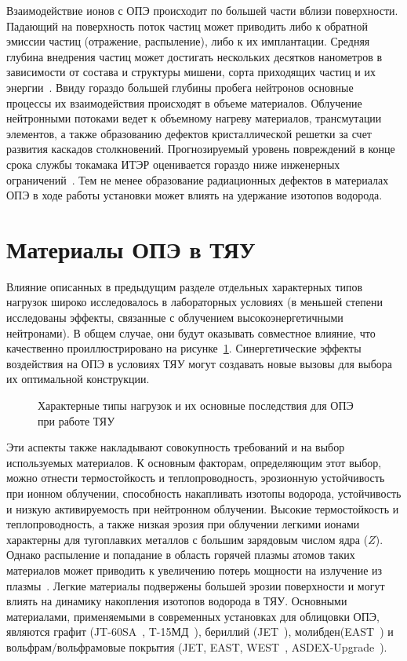 Взаимодействие ионов с ОПЭ происходит по большей части вблизи поверхности. Падающий на поверхность поток частиц может приводить либо к обратной эмиссии частиц (отражение, распыление), либо к их имплантации. Средняя глубина внедрения частиц может достигать нескольких десятков нанометров в зависимости от состава и структуры мишени, сорта приходящих частиц и их энергии~\cite{eckstein2010penetration}. Ввиду гораздо большей глубины пробега нейтронов основные процессы их взаимодействия происходят в объеме материалов. Облучение нейтронными потоками ведет к объемному нагреву материалов, трансмутации элементов, а также образованию дефектов кристаллической решетки за счет развития каскадов столкновений. Прогнозируемый уровень повреждений в конце срока службы токамака ИТЭР оценивается гораздо ниже инженерных ограничений~\cite{Villari2013}. Тем не менее образование радиационных дефектов в материалах ОПЭ в ходе работы установки может влиять на удержание изотопов водорода.

\section{Материалы ОПЭ в ТЯУ}\label{sec:ch1/sec2}

Влияние описанных в предыдущим разделе отдельных характерных типов нагрузок широко исследовалось в лабораторных условиях (в меньшей степени исследованы эффекты, связанные с облучением высокоэнергетичными нейтронами). В общем случае, они будут оказывать совместное влияние, что качественно проиллюстрировано на рисунке~\cref{fig:ch1/synergetic_diagram}. Синергетические эффекты воздействия на ОПЭ в условиях ТЯУ могут создавать новые вызовы для выбора их оптимальной конструкции.
\begin{figure}[ht]
    \caption{Характерные типы нагрузок и их основные последствия для ОПЭ при работе ТЯУ~\cite{Linke2019}}\label{fig:ch1/synergetic_diagram}
\end{figure}
Эти аспекты также накладывают совокупность требований и на выбор используемых материалов. К основным факторам, определяющим этот выбор, можно отнести термостойкость и теплопроводность, эрозионную устойчивость при ионном облучении, способность накапливать изотопы водорода, устойчивость и низкую активируемость при нейтронном облучении. Высокие термостойкость и теплопроводность, а также низкая эрозия при облучении легкими ионами характерны для тугоплавких металлов с большим зарядовым числом ядра ($Z$). Однако распыление и попадание в область горячей плазмы атомов таких материалов может приводить к увеличению потерь мощности на излучение из плазмы~\cite{Ptterich2019}. Легкие материалы подвержены большей эрозии поверхности и могут влиять на динамику накопления изотопов водорода в ТЯУ. Основными материалами, применяемыми в современных установках для облицовки ОПЭ, являются графит (JT-60SA~\cite{Shirai2024}, T-15МД~\cite{Velikhov2024}), бериллий (JET~\cite{Maggi2024,Kappatou2025}), молибден(EAST~\cite{Gong2024}) и вольфрам/вольфрамовые покрытия (JET, EAST, WEST~\cite{Shi2025}, ASDEX-Upgrade~\cite{Rohde2009}).

